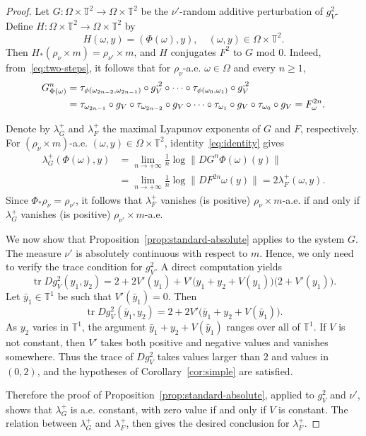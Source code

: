 \documentclass[a4paper,12pt,reqno]{amsart}
\numberwithin{equation}{section}
\newcommand{\Tt}{{\mathbb{T}}}
\begin{document}
\begin{proof}
Let $G \colon \Omega \times \Tt^2 \to \Omega \times \Tt^2$ be the $\nu'$-random additive perturbation of $g^2_V$. Define $H \colon \Omega \times \Tt^2 \to \Omega \times \Tt^2$ by
\[
H(\omega,y)=(\Phi(\omega),y), \quad (\omega,y) \in \Omega \times \Tt^2.
\]
Then $H_*(\rho_\nu\times m)=\rho_{\nu'}\times m$, and $H$ conjugates $F^2$ to $G$ mod $0$. Indeed, from~\eqref{eq:two-steps}, it follows that for $\rho_\nu$-a.e. $\omega\in\Omega$ and every $n \ge 1$,
\begin{align}
\label{eq:identity}
G^n_{\Phi(\omega)} & =\tau_{\phi(\omega_{2n-2},\omega_{2n-1})}\circ g_V^{,2}\circ\cdots\circ
\tau_{\phi(\omega_0,\omega_1)}\circ g_V^{,2} \\
&=\tau_{\omega_{2n-1}}\circ g_V\circ\tau_{\omega_{2n-2}}\circ g_V\circ\cdots\circ
\tau_{\omega_1}\circ g_V\circ\tau_{\omega_0}\circ g_V = F^{2n}_\omega.  \notag
\end{align}

Denote by $\lambda^+_G$ and $\lambda^+_F$ the maximal Lyapunov exponents of $G$ and $F$, respectively. For $(\rho_\nu \times m)$-a.e. $(\omega,y) \in \Omega \times \Tt^2$, identity~\eqref{eq:identity} gives
\begin{align*}
\lambda^+_G\left(\Phi(\omega),y\right) & = \lim_{n \to +\infty} \frac{1}{n} \log \|DG^n{\Phi(\omega)}(y)\| \\
& =  \lim_{n \to +\infty} \frac{1}{n} \log  \|DF^{2n}{\omega}(y)\| =  2 \lambda^+_F(\omega,y).
\end{align*}
Since $\Phi_*\rho_\nu=\rho_{\nu'}$, it follows that $\lambda^+_F$ vanishes (is positive) $\rho_\nu\times m$-a.e. if and only if $\lambda^+_G$ vanishes (is positive) $\rho_{\nu'}\times m$-a.e.

We now show that Proposition~\ref{prop:standard-absolute} applies to the system $G$. The measure $\nu'$ is absolutely continuous with respect to $m$. Hence, we only need to verify the trace condition for $g^2_V$. A direct computation yields
\[
\operatorname{tr} Dg^2_V(y_1,y_2) = 2+2V'(y_1) + V'\bigl(y_1+y_2+V(y_1)\bigr)\bigl(2+V'(y_1)\bigr).
\]
Let $\bar y_1\in\Tt^1$ be such that $V'(\bar y_1)=0$. Then
\[
\operatorname{tr} Dg^2_V(\bar y_1,y_2) = 2+2V'\bigl(\bar y_1+y_2+V(\bar y_1)\bigr).
\]
As $y_2$ varies in $\Tt^1$, the argument $\bar y_1+y_2+V(\bar y_1)$ ranges over all of $\Tt^1$. If $V$ is not constant, then $V'$ takes both positive and negative values and vanishes somewhere. Thus the trace of $Dg^2_V$ takes values larger than $2$ and values in $(0,2)$, and the hypotheses of Corollary~\ref{cor:simple} are satisfied.

Therefore the proof of Proposition~\ref{prop:standard-absolute}, applied to $g_V^2$ and $\nu'$, shows that $\lambda_G^+$ is a.e. constant, with zero value if and only if $V$ is constant. The relation between $\lambda_G^+$ and $\lambda_F^+$, then gives the desired conclusion for $\lambda_F^+$.

\end{proof}
\end{document}
